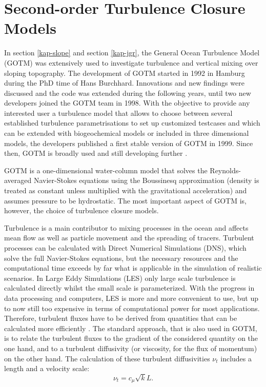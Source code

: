 \chapter{Second-order Turbulence Closure Models}

In section \ref{kap-slope} and section \ref{kap-jgr}, the General Ocean Turbulence Model (GOTM) was extensively used to investigate turbulence and vertical mixing over sloping topography. The development of GOTM started in 1992 in Hamburg during the PhD time of Hans Burchhard. Innovations and new findings were discussed and the code was extended during the following years, until two new developers joined the GOTM team in 1998. With the objective to provide any interested user a turbulence model that allows to choose between several established turbulence parametrisations to set up customized testcases and which can be extended with biogeochemical models or included in three dimensional models, the developers published a first stable version of GOTM in 1999. Since then, GOTM is broadly used and still developing further \citep[][]{gotm1999}.

GOTM is a one-dimensional water-column model that solves the Reynolds-averaged Navier-Stokes equations using the Boussinesq approximation (density is treated as constant unless multiplied with the gravitational acceleration) and assumes pressure to be hydrostatic. The most important aspect of GOTM is, however, the choice of turbulence closure models. 

Turbulence is a main contributor to mixing processes in the ocean and affects mean flow as well as particle movement and the spreading of tracers. Turbulent processes can be calculated with Direct Numerical Simulations (DNS), which solve the full Navier-Stokes equations, but the necessary resources and the computational time exceeds by far what is applicable in the simulation of realistic scenarios. In Large Eddy Simulations (LES) only large scale turbulence is calculated directly whilst the small scale is parameterized. With the progress in data processing and computers, LES is more and more convenient to use, but up to now still too expensive in terms of computational power for most applications. Therefore, turbulent fluxes have to be derived from quantities that can be calculated more efficiently \citep[][]{UmlaufBurchard2005a}. The standard approach, that is also used in GOTM, is to relate the turbulent fluxes to the gradient of the considered quantity on the one hand, and to a turbulent diffusivity (or viscosity, for the flux of momentum) on the other hand. The calculation of these turbulent diffusivities $\nu_t$ includes a length and a velocity scale:
\begin{equation}
 \label{turbulence}
 \nu_t = c_\mu \sqrt{k} L.
\end{equation}

